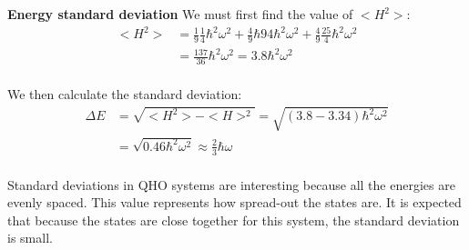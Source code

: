 \documentclass[10pt]{article} %
\begin{document}
\textbf{Energy standard deviation}
We must first find the value of $<H^2>$:
\begin{align*}
  <H^2> &= \frac{1}{9}\frac{1}{4}\hbar^2\omega^2 + \frac{4}{9}\hbar{9}{4}\hbar^2\omega^2
  + \frac{4}{9}\frac{25}{4}\hbar^2\omega^2\\
  &= \frac{137}{36}\hbar^2\omega^2 = 3.8\hbar^2\omega^2\\
\end{align*}

We then calculate the standard deviation:
\begin{align*}
  \Delta E &= \sqrt{<H^2> - <H>^2} = \sqrt{(3.8 - 3.34)\hbar^2\omega^2}\\
  &= \sqrt{0.46\hbar^2\omega^2} \approx \frac{2}{3}\hbar\omega\\
\end{align*}

Standard deviations in QHO systems are interesting because all the energies are evenly spaced. This
value represents how spread-out the states are. It is expected that because the states are close
together for this system, the standard deviation is small.
\end{document}
